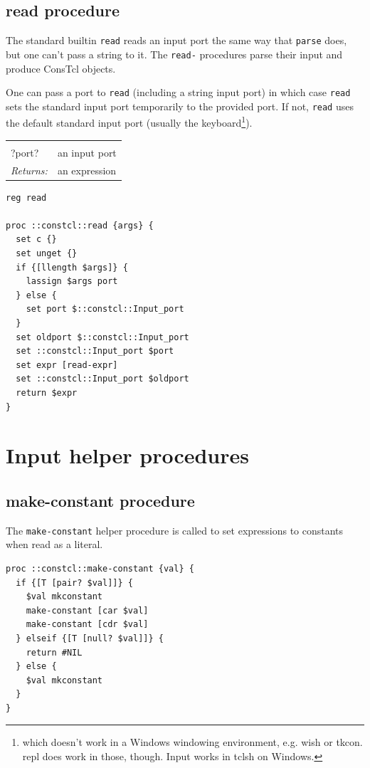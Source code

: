 \documentclass[twoside,9pt]{report}
\begin{document}
\subsection{read procedure}
\label{read-procedure}


The standard builtin \texttt{read} reads an input port the same way that \texttt{parse} does, but one can't pass a string to it. The \texttt{read-} procedures parse their input and produce ConsTcl objects.


One can pass a port to \texttt{read} (including a string input port) in which case \texttt{read} sets the standard input port temporarily to the provided port. If not, \texttt{read} uses the default standard input port (usually the keyboard\footnote{which doesn't work in a Windows windowing environment, e.g. wish or tkcon. repl does work in those, though. Input works in tclsh on Windows.}).

\noindent\begin{tabular}{ |p{1.9cm} p{8cm}| }
\hline
\rowcolor[HTML]{CCCCCC} \multicolumn{2}{|l|}{\bf read (public)} \\
?port? & an input port \\
\textit{Returns:} & an expression \\
\hline
\end{tabular}
\begin{lstlisting}
reg read

proc ::constcl::read {args} {
  set c {}
  set unget {}
  if {[llength $args]} {
    lassign $args port
  } else {
    set port $::constcl::Input_port
  }
  set oldport $::constcl::Input_port
  set ::constcl::Input_port $port
  set expr [read-expr]
  set ::constcl::Input_port $oldport
  return $expr
}
\end{lstlisting}
\section{Input helper procedures}
\label{input-helper-procedures}
\subsection{make-constant procedure}
\label{make-constant-procedure}


The \texttt{make-constant} helper procedure is called to set expressions to constants when read as a literal.

\begin{lstlisting}
proc ::constcl::make-constant {val} {
  if {[T [pair? $val]]} {
    $val mkconstant
    make-constant [car $val]
    make-constant [cdr $val]
  } elseif {[T [null? $val]]} {
    return #NIL
  } else {
    $val mkconstant
  }
}
\end{lstlisting}
\end{document}
